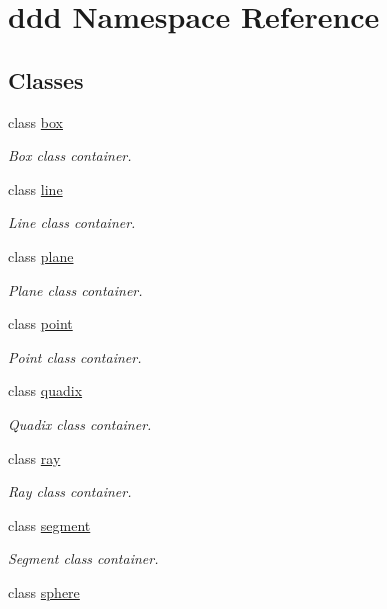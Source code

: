 \hypertarget{namespaceddd}{}\section{ddd Namespace Reference}
\label{namespaceddd}
\subsection*{Classes}
\begin{DoxyCompactItemize}
\item 
class \hyperlink{classddd_1_1box}{box}
\begin{DoxyCompactList}\small\item\em Box class container. \end{DoxyCompactList}\item 
class \hyperlink{classddd_1_1line}{line}
\begin{DoxyCompactList}\small\item\em Line class container. \end{DoxyCompactList}\item 
class \hyperlink{classddd_1_1plane}{plane}
\begin{DoxyCompactList}\small\item\em Plane class container. \end{DoxyCompactList}\item 
class \hyperlink{classddd_1_1point}{point}
\begin{DoxyCompactList}\small\item\em Point class container. \end{DoxyCompactList}\item 
class \hyperlink{classddd_1_1quadix}{quadix}
\begin{DoxyCompactList}\small\item\em Quadix class container. \end{DoxyCompactList}\item 
class \hyperlink{classddd_1_1ray}{ray}
\begin{DoxyCompactList}\small\item\em Ray class container. \end{DoxyCompactList}\item 
class \hyperlink{classddd_1_1segment}{segment}
\begin{DoxyCompactList}\small\item\em Segment class container. \end{DoxyCompactList}\item 
class \hyperlink{classddd_1_1sphere}{sphere}

\end{DoxyCompactItemize}
